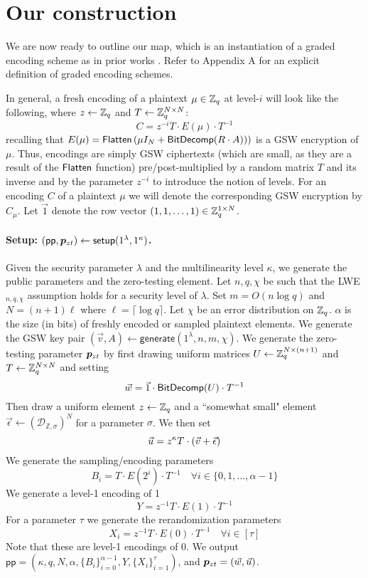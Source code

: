 \section{Our construction}

We are now ready to outline our map, which is an instantiation of a graded encoding scheme as in prior works \cite{clt, ggh13a, ggh14a, clt15}.  Refer to Appendix A for an explicit definition of graded encoding schemes. 

In general, a fresh encoding of a plaintext $\mu \in \mathbb{Z}_q$ at level-$i$ will look like the following, where $z \leftarrow \mathbb{Z}_q$ and $T\leftarrow \mathbb{Z}_q^{N \times N}$:
$$C = z^{-i}T \cdot E(\mu)\cdot T^{-1}$$
recalling that $E(\mu) = \mathsf{Flatten}\left(\mu I_{N} + \mathsf{BitDecomp}(R\cdot A))\right)$ is a GSW encryption of $\mu$. Thus, encodings are simply GSW ciphertexts (which are small, as they are a result of the $\mathsf{Flatten}$ function) pre/post-multiplied by a random matrix $T$ and its inverse and by the parameter $z^{-i}$ to introduce the notion of levels.  For an encoding $C$ of a plaintext $\mu$ we will denote the corresponding GSW encryption by $C_\mu$.  Let $\vec{1}$ denote the row vector $(1,1,\ldots, 1) \in \mathbb{Z}_q^{1 \times N}$.

\paragraph{Setup: $(\mathsf{pp},\bm{p}_{zt}) \leftarrow \mathsf{setup}(1^\lambda, 1^\kappa)$.}  Given the security parameter $\lambda$ and the multilinearity level $\kappa$, we generate the public parameters and the zero-testing element.  Let $n,q, \chi$ be such that the LWE$_{n,q,\chi}$ assumption holds for a security level of $\lambda$.  Set $m = O(n\log q)$ and $N = (n+1)\ell$ where $\ell = \lceil \log q \rceil$.  Let $\chi$ be an error distribution on $\mathbb{Z}_q$.  $\alpha$ is the size (in bits) of freshly encoded or sampled plaintext elements.  We generate the GSW key pair $(\vec{v},A) \leftarrow \mathsf{generate}(1^\lambda,n,m, \chi)$.  We generate the zero-testing parameter $\bm{p}_{zt}$ by first drawing uniform matrices $U \leftarrow \mathbb{Z}_q^{N\times (n+1)}$ and $T \leftarrow \mathbb{Z}_q^{N \times N}$ and setting $$\vec{w} = \vec{1}\cdot \mathsf{BitDecomp}(U)\cdot T^{-1}$$  Then draw a uniform element $z \leftarrow \mathbb{Z}_q$ and a ``somewhat small" element $\vec{\epsilon} \leftarrow (\mathcal{D}_{\mathbb{Z}, \sigma})^N$ for a parameter $\sigma$.  We then set $$\vec{u} = z^\kappa T\cdot (\vec{v} + \vec{\epsilon})$$  We generate the sampling/encoding parameters $$B_i = T\cdot E(2^i) \cdot T^{-1} \quad \forall i \in \{0,1,\ldots,\alpha-1\}$$  We generate a level-1 encoding of 1 $$Y = z^{-1}T\cdot E(1) \cdot T^{-1}$$  For a parameter $\tau$ we generate the rerandomization parameters $$X_i = z^{-1}T\cdot E(0) \cdot T^{-1} \quad \forall i \in [\tau]$$  Note that these are level-1 encodings of 0. We output $\mathsf{pp} = (\kappa, q,N,\alpha, \{B_i\}_{i=0}^{\alpha-1}, Y, \{X_i\}_{i=1}^\tau)$, and $\bm{p}_{zt} = (\vec{w},\vec{u})$.

